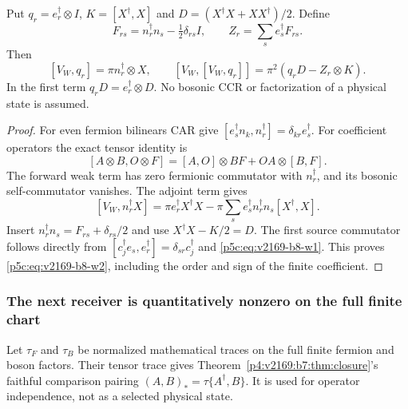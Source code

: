 \documentclass[12pt,a4paper]{article}
\begin{document}
\begin{theorem}
\label{p5c:v2169:b8:thm:weaksecond}
Put $q_r=e_r^\dagger\otimes I$, $K=[X^\dagger,X]$ and
$D=(X^\dagger X+XX^\dagger)/2$. Define
\[
 F_{rs}=n_r^\dagger n_s-\tfrac12\delta_{rs}I,
 \qquad Z_r=\sum_s e_s^\dagger F_{rs}.
\]
Then
\begin{equation}
 \boxed{[V_W,q_r]=\pi n_r^\dagger\otimes X,\qquad
 [V_W,[V_W,q_r]]
       =\pi^2(q_rD-Z_r\otimes K).}
 \label{p5c:eq:v2169-b8-w2}
\end{equation}
In the first term $q_rD=e_r^\dagger\otimes D$. No bosonic CCR or
factorization of a physical state is assumed.
\end{theorem}
\begin{proof}
For even fermion bilinears CAR give
$[e_s^\dagger n_k,n_r^\dagger]=\delta_{kr}e_s^\dagger$.
For coefficient operators the exact tensor identity is
\[
 [A\otimes B,O\otimes F]=[A,O]\otimes BF
                            +OA\otimes[B,F].
\]
The forward weak term has zero fermionic commutator with $n_r^\dagger$,
and its bosonic self-commutator vanishes. The adjoint term gives
\[
 [V_W,n_r^\dagger X]
  =\pi e_r^\dagger X^\dagger X
   -\pi\sum_s e_s^\dagger n_r^\dagger n_s[X^\dagger,X].
\]
Insert $n_r^\dagger n_s=F_{rs}+\delta_{rs}/2$ and use
$X^\dagger X-K/2=D$. The first source commutator follows directly from
$[c_j^\dagger e_s,e_r^\dagger]=\delta_{sr}c_j^\dagger$ and \eqref{p5c:eq:v2169-b8-w1}.
This proves \eqref{p5c:eq:v2169-b8-w2}, including the order and sign of the finite coefficient.
\end{proof}

\subsubsection{The next receiver is quantitatively nonzero on the full finite chart}
Let $\tau_F$ and $\tau_B$ be normalized mathematical traces on the full
finite fermion and boson factors. Their tensor trace gives Theorem~\ref{p4:v2169:b7:thm:closure}'s
faithful comparison pairing $(A,B)_*=\tau\{A^\dagger,B\}$.
It is used for operator independence, not as a selected physical state.
\end{document}
